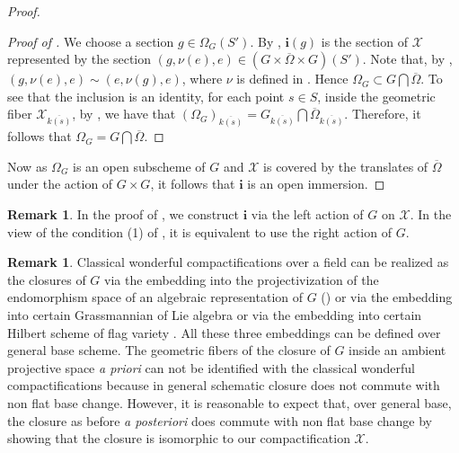 \documentclass[11pt, reqno]{amsart}
\theoremstyle{plain}
\theoremstyle{definition}
\newtheorem{remark}[theorem]{Remark}
\begin{document}
\begin{proof}
   \begin{proof}[Proof of ] 
       We choose a section $g\in\Omega_G(S')$. By , $\mathbf{i}(g)$ is the section of $\mathcal{X}$ represented by the section $(g,\nu(e),e)\in( G\times\overline{\Omega}\times G)(S')$. Note that, by , $(g,\nu(e),e)\sim(e, \nu(g),e)$, where $\nu$ is defined in . Hence $\Omega_G\subset G\bigcap \overline{\Omega}$.
    To see that the inclusion is an identity, for each point $s\in S$, inside the geometric fiber $\mathcal{X}_{\overline{k(s)}}$, by \cite[Proposition~6.1.7]{BrionKumar}, we have that $(\Omega_G)_{\overline{k(s)}}=G_{\overline{k(s)}}\bigcap \overline{\Omega}_{\overline{k(s)}}$. Therefore, it follows that $\Omega_G= G\bigcap \overline{\Omega}$.
   \end{proof}
    
    Now as $\Omega_G$ is an open subscheme of $G$ \cite[exposé~XXII, proposition~4.1.2]{SGA3III} and $\mathcal{X}$ is covered by the translates of $\overline{\Omega}$ under the action of $G\times G$, it follows that $\mathbf{i}$ is an open immersion.
    
\end{proof}

\begin{remark}
    In the proof of , we construct $\mathbf{i}$ via the left action of $G$ on $\mathcal{X}$. In the view of the condition (1) of , it is equivalent to use the right action of $G$.
\end{remark}

\begin{remark}
Classical wonderful compactifications over a field can be realized as the closures of $G$ via the embedding into the projectivization of the endomorphism space of an algebraic representation of $G$ () or via the embedding into certain Grassmannian of Lie algebra \cite[\S~6]{completesymmetricvarieties} or via the embedding into certain Hilbert scheme of flag variety \cite{compactificationHilbertsch}. All these three embeddings can be defined over general base scheme. The geometric fibers of the closure of $G$ inside an ambient projective space \emph{a priori} can not be identified with the classical wonderful compactifications because in general schematic closure does not commute with non flat base change. However, it is reasonable to expect that, over general base, the closure as before \emph{a posteriori} does commute with non flat base change by showing that the closure is isomorphic to our compactification $\mathcal{X}$.
\end{remark}
\end{document}
